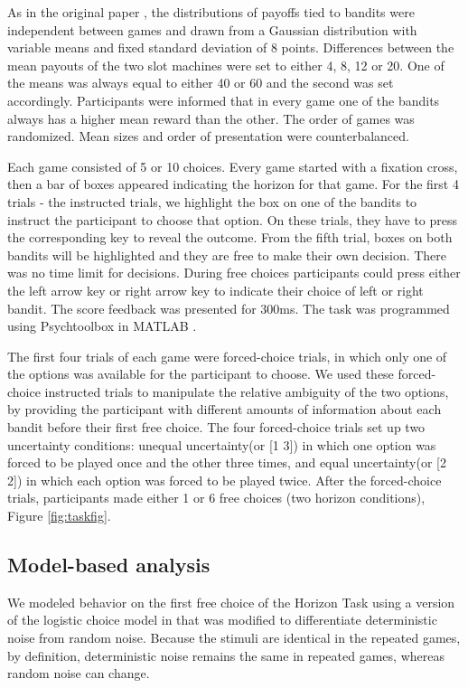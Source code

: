 \documentclass[12pt]{article}
\begin{document}
{As in the original paper \citep{wilson2014}, the distributions of payoffs tied to bandits were independent between games and drawn from a Gaussian distribution with variable means and fixed standard deviation of 8 points. Differences between the mean payouts of the two slot machines were set to either 4, 8, 12 or 20. One of the means was always equal to either 40 or 60 and the second was set accordingly. Participants were informed that in every game one of the bandits always has a higher mean reward than the other. The order of games was randomized. Mean sizes and order of presentation were counterbalanced. 

Each game consisted of 5 or 10 choices. Every game started with a fixation cross, then a bar of boxes appeared indicating the horizon for that game. For the first 4 trials - the instructed trials, we highlight the box on one of the bandits to instruct the participant to choose that option. On these trials, they have to press the corresponding key to reveal the outcome. From the fifth trial, boxes on both bandits will be highlighted and they are free to make their own decision. There was no time limit for decisions. During free choices participants could press either the left arrow key or right arrow key to indicate their choice of left or right bandit. The score feedback was presented for 300ms. The task was programmed using Psychtoolbox in MATLAB \citep{psychtoolbox1, psychtoolbox2}. 

The first four trials of each game were forced-choice trials, in which only one of the options was available for the participant to choose. We used these forced-choice instructed trials to manipulate the relative ambiguity of the two options, by providing the participant with different amounts of information about each bandit before their first free choice. The four forced-choice trials set up two uncertainty conditions: unequal uncertainty(or [1 3]) in which one option was forced to be played once and the other three times, and equal uncertainty(or [2 2]) in which each option was forced to be played twice. After the forced-choice trials, participants made either 1 or 6 free choices (two horizon conditions),  Figure \ref{fig:taskfig}.

\subsection*{Model-based analysis}
We modeled behavior on the first free choice of the Horizon Task using a version of the logistic choice model in \citep{wilson2014} that was modified to differentiate deterministic noise from random noise. Because the stimuli are identical in the repeated games, by definition, deterministic noise remains the same in repeated games, whereas random noise can change. 

}
\end{document}

